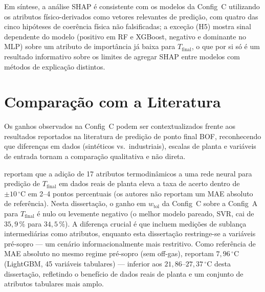 Em síntese, a análise SHAP é consistente com os modelos da Config~C utilizando os atributos físico-derivados como vetores relevantes de predição, com quatro das cinco hipóteses de coerência física não falsificadas; a exceção (H5) mostra sinal dependente do modelo (positivo em RF e XGBoost, negativo e dominante no MLP) sobre um atributo de importância já baixa para $T_\text{final}$, o que por si só é um resultado informativo sobre os limites de agregar SHAP entre modelos com métodos de explicação distintos.


\section{Comparação com a Literatura}
\label{sec:comparacao-literatura}

Os ganhos observados na Config~C podem ser contextualizados frente aos resultados reportados na literatura de predição de ponto final BOF, reconhecendo que diferenças em dados (sintéticos vs.\ industriais), escalas de planta e variáveis de entrada tornam a comparação qualitativa e não direta.

 reportam que a adição de 17 atributos termodinâmicos a uma rede neural para predição de $T_\text{final}$ em dados reais de planta eleva a taxa de acerto dentro de $\pm 10\,^\circ\text{C}$ em 2--4 pontos percentuais (os autores não reportam um MAE absoluto de referência). Nesta dissertação, o ganho em $w_\text{tol}$ da Config~C sobre a Config~A para $T_\text{final}$ é nulo ou levemente negativo (o melhor modelo pareado, SVR, cai de $35{,}9\,\%$ para $34{,}5\,\%$). A diferença crucial é que  incluem medições de sublança intermediárias como atributos, enquanto esta dissertação restringe-se a variáveis pré-sopro --- um cenário informacionalmente mais restritivo. Como referência de MAE absoluto no mesmo regime pré-sopro (sem off-gas),  reportam $7{,}96\,^\circ\text{C}$ (LightGBM, 45 variáveis tabulares) --- inferior aos $21{,}86$--$27{,}37\,^\circ\text{C}$ desta dissertação, refletindo o benefício de dados reais de planta e um conjunto de atributos tabulares mais amplo.

